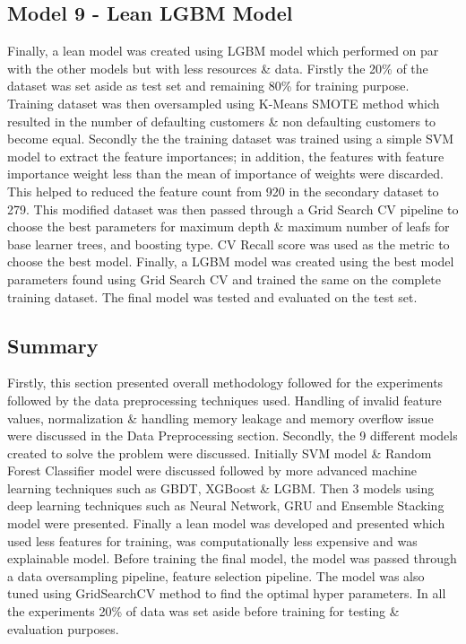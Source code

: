 \documentclass[twoside,11pt,a4paper]{article}
\begin{document}
\subsection{Model 9 - Lean \acs{LGBM} Model}
Finally, a lean model was created using \acs{LGBM} model which performed on par with the other models but with less resources \& data. Firstly the 20\% of the dataset was set aside as test set and remaining 80\% for training purpose. Training dataset was then oversampled using K-Means \acs{SMOTE} method which resulted in the number of defaulting customers \& non defaulting customers to become equal. Secondly the the training dataset was trained using a simple \acs{SVM} model to extract the feature importances; in addition, the features with feature importance weight less than the mean of importance of weights were discarded. This helped to reduced the feature count from 920 in the secondary dataset to 279. This modified dataset was then passed through a Grid Search CV pipeline to choose the best parameters for maximum depth \& maximum number of leafs for base learner trees, and boosting type. \acf{CV} Recall score was used as the metric to choose the best model. Finally, a \acs{LGBM} model was created using the best model parameters found using Grid Search CV and trained the same on the complete training dataset. The final model was tested and evaluated on the test set.

\subsection{Summary}
Firstly, this section presented overall methodology followed for the experiments followed by the data preprocessing techniques used. Handling of invalid feature values, normalization \& handling memory leakage and memory overflow issue were discussed in the Data Preprocessing section. Secondly, the 9 different models created to solve the problem were discussed. Initially \acs{SVM} model \& Random Forest Classifier model were discussed followed by more advanced machine learning techniques such as \acs{GBDT}, \acs{XGBoost} \& \acs{LGBM}. Then 3 models using deep learning techniques such as Neural Network, \acs{GRU}  and Ensemble Stacking model were presented. Finally a lean model was developed and presented which used less features for training, was computationally less expensive and was explainable model. Before training the final model, the model was passed through a data oversampling pipeline, feature selection pipeline. The model was also tuned using GridSearchCV method to find the optimal hyper parameters. In all the experiments 20\% of data was set aside before training for testing \& evaluation purposes.
\vfill
\clearpage
\end{document}
